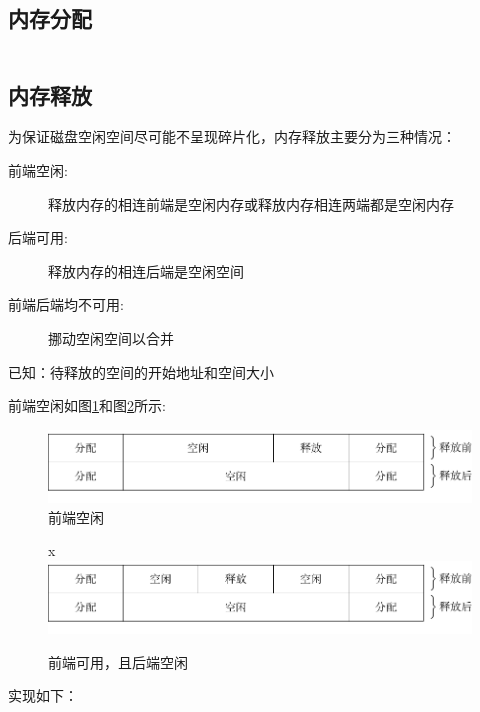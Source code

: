 \documentclass{swfcthesis}
\begin{document}
\subsection{内存分配}

\begin{listing}[H]
  \inputminted[tabsize=2, firstline=68, lastline=80,
  linenos=true]{c}{../ZOS/src/kernel/memory.c}
\end{listing}

\subsection{内存释放}

为保证磁盘空闲空间尽可能不呈现碎片化，内存释放主要分为三种情况：

\begin{description}
\item[前端空闲:]释放内存的相连前端是空闲内存或释放内存相连两端都是空闲内存
\item[后端可用:]释放内存的相连后端是空闲空间
\item[前端后端均不可用:]挪动空闲空间以合并
\end{description}

已知：待释放的空间的开始地址和空间大小

\newpage

前端空闲如图\ref{fig:mem0}和图\ref{fig:mem1}所示: 

\begin{figure}[h]
  \centering
  \includegraphics[width=.7\textwidth]{fig/mem0.pdf}
  \caption{前端空闲}
  \label{fig:mem0}
\end{figure}

\begin{figure}[h]
  \centering
x  \includegraphics[width=.7\textwidth]{fig/mem1.pdf}
  \caption{前端可用，且后端空闲}
  \label{fig:mem1}
\end{figure}

实现如下：

\begin{listing}[H]
  \inputminted[tabsize=2, firstline=98, lastline=116,
  linenos=true]{c}{../ZOS/src/kernel/memory.c}
\end{listing}
\end{document}
